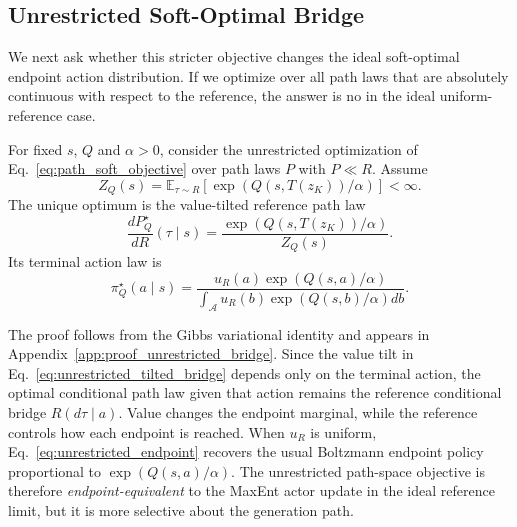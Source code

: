 \documentclass[11pt]{article}
\begin{document}
\subsection{Unrestricted Soft-Optimal Bridge}

We next ask whether this stricter objective changes the ideal soft-optimal endpoint action distribution. If we optimize over all path laws that are absolutely continuous with respect to the reference, the answer is no in the ideal uniform-reference case.

\begin{theorem}
For fixed $s$, $Q$ and $\alpha>0$, consider the unrestricted optimization of Eq.~\eqref{eq:path_soft_objective} over path laws $P$ with $P\ll R$. Assume
\begin{equation}
  Z_Q(s)
  =
  \mathbb E_{\tau\sim R}
  \left[
    \exp
    \left(
      Q(s,T(z_K))/\alpha
    \right)
  \right]
  <
  \infty.
\end{equation}
The unique optimum is the value-tilted reference path law
\begin{equation}
  \frac{dP_Q^\star}{dR}(\tau\mid s)
  =
  \frac{
    \exp
    \left(
      Q(s,T(z_K))/\alpha
    \right)
  }{
    Z_Q(s)
  }.
  \label{eq:unrestricted_tilted_bridge}
\end{equation}
Its terminal action law is
\begin{equation}
  \pi_Q^\star(a\mid s)
  =
  \frac{
    u_R(a)
    \exp
    \left(
      Q(s,a)/\alpha
    \right)
  }{
    \int_{\mathcal A}
    u_R(b)
    \exp
    \left(
      Q(s,b)/\alpha
    \right)
    db
  }.
  \label{eq:unrestricted_endpoint}
\end{equation}
\end{theorem}

The proof follows from the Gibbs variational identity and appears in Appendix~\ref{app:proof_unrestricted_bridge}. Since the value tilt in Eq.~\eqref{eq:unrestricted_tilted_bridge} depends only on the terminal action, the optimal conditional path law given that action remains the reference conditional bridge $R(d\tau\mid a)$. Value changes the endpoint marginal, while the reference controls how each endpoint is reached. When $u_R$ is uniform, Eq.~\eqref{eq:unrestricted_endpoint} recovers the usual Boltzmann endpoint policy proportional to $\exp(Q(s,a)/\alpha)$. The unrestricted path-space objective is therefore \emph{endpoint-equivalent} to the MaxEnt actor update in the ideal reference limit, but it is more selective about the generation path.
\end{document}
